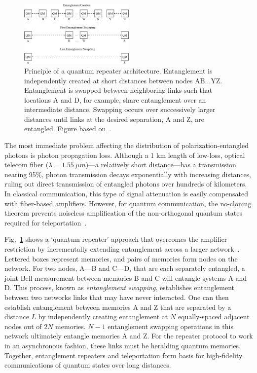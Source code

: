 \documentclass[aps,twocolumn,secnumarabic,amsmath,amssymb,pra,groupedaddress,
showpacs, showkeys]{revtex4-1}
\begin{document}
\begin{figure}[t]
\centering
\includegraphics[width=0.50\textwidth]{figures/connection.pdf}
\caption{\label{fig:chap1:connection} Principle of a quantum repeater architecture. Entanglement is independently created at short distances between nodes $\textrm{AB}\ldots\textrm{YZ}$. Entanglement is swapped between neighboring links such that locations A and D, for example, share entanglement over an intermediate distance. Swapping occurs over successively larger distances until links at the desired separation, A and Z, are entangled. Figure based on~\cite{2009arXiv0906.2699S}.}
\end{figure}

The most immediate problem affecting the distribution of polarization-entangled
photons is photon propagation loss. Although a 1 km length of low-loss, optical
telecom fiber ($\lambda = 1.55~\mu m$)---a relatively short distance---has a
transmission nearing 95\%, photon transmission decays exponentially with
increasing distances, ruling out direct transmission of entangled photons over
hundreds of kilometers. In classical communication, this type of signal
attenuation is easily compensated with fiber-based amplifiers. However, for
quantum communication, the no-cloning theorem prevents noiseless amplification
of the non-orthogonal quantum states required for
teleportation~\cite{citeulike:507853}.

Fig.~\ref{fig:chap1:connection} shows a `quantum repeater' approach that
overcomes the amplifier restriction by incrementally extending entanglement
across a larger network~\cite{2009arXiv0906.2699S}. Lettered boxes represent
memories, and pairs of memories form nodes on the network. For two nodes, A---B
and C---D, that are each separately entangled, a joint Bell measurement between
memories B and C will entangle systems A and D. This process, known as
\emph{entanglement swapping}, establishes entanglement between two networks
links that may have never interacted. One can then establish entanglement
between memories A and Z that are separated by a distance $L$ by independently
creating entanglement at $N$ equally-spaced adjacent nodes out of $2N$
memories. $N-1$ entanglement swapping operations in this network ultimately
entangle memories A and Z. For the repeater protocol to work in an asynchronous
fashion, these links must be heralding quantum memories. Together,
entanglement repeaters and teleportation form basis for high-fidelity
communications of quantum states over long distances.
\end{document}
